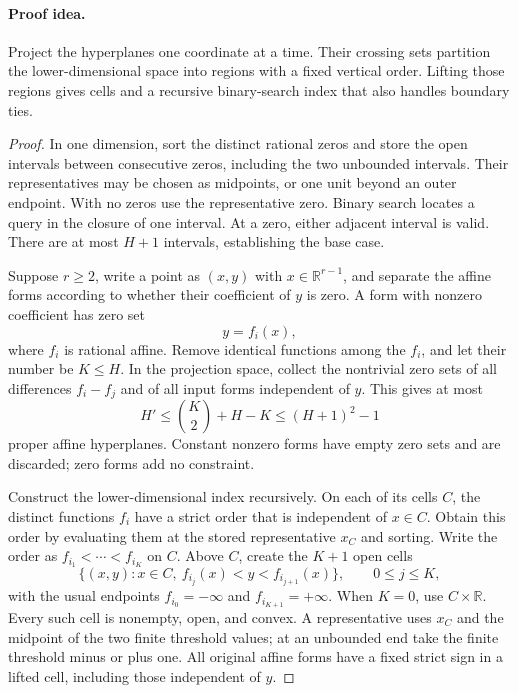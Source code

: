 \paragraph{Proof idea.}
Project the hyperplanes one coordinate at a time.  Their crossing sets partition the lower-dimensional space into regions with a fixed vertical order.  Lifting those regions gives cells and a recursive binary-search index that also handles boundary ties.

\begin{proof}
In one dimension, sort the distinct rational zeros and store the
open intervals between consecutive zeros, including the two
unbounded intervals.  Their representatives may be chosen as
midpoints, or one unit beyond an outer endpoint.  With no zeros
use the representative zero.  Binary search locates a query in
the closure of one interval.  At a zero, either adjacent interval
is valid.  There are at most $H+1$ intervals, establishing the base
case.

Suppose $r\ge2$, write a point as $(x,y)$ with
$x\in\mathbb R^{r-1}$, and separate the affine forms according to
whether their coefficient of $y$ is zero.  A form with nonzero
coefficient has zero set
\[
 y=f_i(x),
\]
where $f_i$ is rational affine.  Remove identical functions among
the $f_i$, and let their number be $K\le H$.  In the projection
space, collect the nontrivial zero sets of all differences
$f_i-f_j$ and of all input forms independent of $y$.  This gives
at most
\[
 H'\le \binom K2+H-K\le (H+1)^2-1
\]
proper affine hyperplanes.  Constant nonzero forms have empty zero
sets and are discarded; zero forms add no constraint.

Construct the lower-dimensional index recursively.  On each of
its cells $C$, the distinct functions $f_i$ have a strict order
that is independent of $x\in C$.  Obtain this order by evaluating
them at the stored representative $x_C$ and sorting.  Write the
order as
$f_{i_1}<\cdots<f_{i_K}$ on $C$.  Above $C$, create the $K+1$
open cells
\[
 \{(x,y):x\in C,\ f_{i_j}(x)<y<f_{i_{j+1}}(x)\},
 \qquad 0\le j\le K,
\]
with the usual endpoints $f_{i_0}=-\infty$ and
$f_{i_{K+1}}=+\infty$.  When $K=0$, use $C\times\mathbb R$.
Every such cell is nonempty, open, and convex.  A representative
uses $x_C$ and the midpoint of the two finite threshold values;
at an unbounded end take the finite threshold minus or plus one.
All original affine forms have a fixed strict sign in a lifted
cell, including those independent of $y$.


\end{proof}
